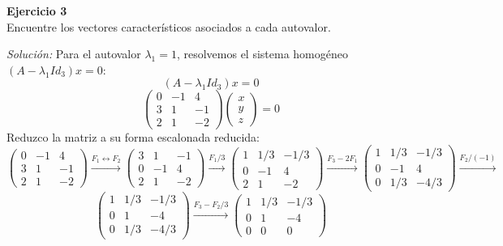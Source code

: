 \documentclass{article}
\newenvironment{problem}[2][Ejercicio]
    { \begin{mdframed}[backgroundcolor=gray!20] \textbf{#1 #2} \\}
    {  \end{mdframed}}
\newenvironment{solution}
    {\textit{Solución:}}
    {}
\begin{document}
\begin{problem}{3}
    Encuentre los vectores característicos asociados a cada autovalor.
\end{problem}
\begin{solution}
    Para el autovalor $\lambda_1 = 1$, resolvemos el sistema homogéneo $(A - \lambda_1 Id_3)x = 0$:
    $$
    (A - \lambda_1 Id_3)x = 0
    $$
    $$
    \begin{pmatrix}
    0 & -1 & 4 \\
    3 & 1 & -1 \\
    2 & 1 & -2
    \end{pmatrix}
    \begin{pmatrix}
    x \\
    y \\
    z
    \end{pmatrix}
    = 0
    $$
    Reduzco la matriz a su forma escalonada reducida:
    $$
    \begin{pmatrix}
        0 & -1 & 4 \\
        3 & 1 & -1 \\
        2 & 1 & -2
    \end{pmatrix} \xrightarrow{F_1 \leftrightarrow F_2}
    \begin{pmatrix}
        3 & 1 & -1 \\
        0 & -1 & 4 \\
        2 & 1 & -2
    \end{pmatrix} \xrightarrow{F_1/3}
    \begin{pmatrix}
        1 & 1/3 & -1/3 \\
        0 & -1 & 4 \\
        2 & 1 & -2
    \end{pmatrix} \xrightarrow{F_3-2F_1}
    \begin{pmatrix}
        1 & 1/3 & -1/3 \\
        0 & -1 & 4 \\
        0 & 1/3 & -4/3
    \end{pmatrix} \xrightarrow{F_2/(-1)}
    $$
    $$
    \begin{pmatrix}
        1 & 1/3 & -1/3 \\
        0 & 1 & -4 \\
        0 & 1/3 & -4/3
    \end{pmatrix} \xrightarrow{F_3 - F_2/3}
    \begin{pmatrix}
        1 & 1/3 & -1/3 \\
        0 & 1 & -4 \\
        0 & 0 & 0

\end{pmatrix}$$
\end{solution}
\end{document}

